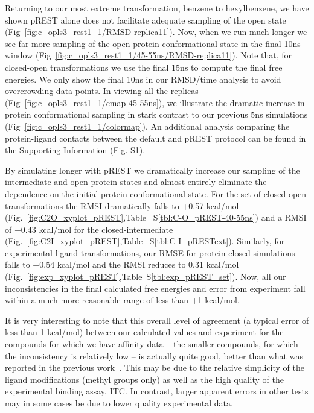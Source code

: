 \documentclass[journal=jctcce,manuscript=article]{achemso}
\begin{document}
Returning to our most extreme transformation, benzene to hexylbenzene, we have shown pREST alone does not facilitate adequate sampling of the open state (Fig~\ref{fig:c_opls3_rest1_1/RMSD-replica11}).
Now, when we run much longer we see far more sampling of the open protein conformational state in the final 10ns window (Fig~\ref{fig:c_opls3_rest1_1/45-55ns/RMSD-replica11}).
Note that, for closed-open transformations we use the final 15ns to compute the final free energies.
We only show the final 10ns in our RMSD/time analysis to avoid overcrowding data points.
In viewing all the replicas (Fig~\ref{fig:c_opls3_rest1_1/cmap-45-55ns}), we illustrate the dramatic increase in protein conformational sampling in stark contrast to our previous 5ns simulations (Fig~\ref{fig:c_opls3_rest1_1/colormap}).
An additional analysis comparing the protein-ligand contacts between the default and pREST protocol can be found in the Supporting Information (Fig. S1).

By simulating longer with pREST we dramatically increase our sampling of the intermediate and open protein states and almost entirely eliminate the dependence on the initial protein conformational state.
For the set of closed-open transformations the RMSI dramatically falls to +0.57 kcal/mol (Fig.~\ref{fig:C2O_xyplot_pREST},Table ~S\ref{tbl:C-O_pREST-40-55ns}) and a RMSI of +0.43 kcal/mol for the closed-intermediate (Fig.~\ref{fig:C2I_xyplot_pREST},Table ~S\ref{tbl:C-I_pRESText}).
Similarly, for experimental ligand transformations, our RMSE for protein closed simulations falls to +0.54 kcal/mol and the RMSI reduces to 0.31 kcal/mol (Fig.~\ref{fig:exp_xyplot_pREST},Table~S\ref{tbl:exp_pREST_set}).
Now, all our inconsistencies in the final calculated free energies and error from experiment fall within a much more reasonable range of less than +1 kcal/mol.  

It is very interesting to note that this overall level of agreement (a typical error of less than 1 kcal/mol) between our calculated values and experiment for the compounds for which we have affinity data -- the smaller compounds, for which the inconsistency is relatively low -- is actually quite good, better than what was reported in the previous work~\cite{FEPplus}.  This may be due to the relative simplicity of the ligand modifications (methyl groups only) as well as the high quality of the experimental binding assay, ITC. In contrast, larger apparent errors in other tests may in some cases be due to lower quality experimental data. 
 
\end{document}
